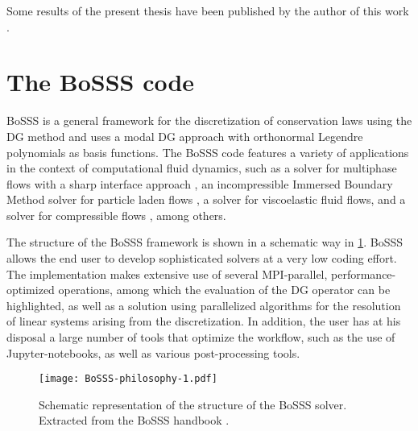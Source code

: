 Some results of the present thesis have been published by the author of this work \parencite{gutierrez-jorqueraFullyCoupledHigh2022}.


\section{The BoSSS code}
BoSSS is a general framework for the discretization of conservation laws using the DG method and uses a modal DG approach with orthonormal Legendre polynomials as basis functions. The BoSSS code features a variety of applications in the context of computational fluid dynamics, such as a solver for multiphase flows with a sharp interface approach \parencite{kummerExtendedDiscontinuousGalerkin2017}, an incompressible Immersed Boundary Method solver for particle laden flows \parencite{krauseIncompressibleImmersedBoundary2017}, a solver for viscoelastic fluid flows\parencite{kikkerFullyCoupledHighorder}, and a solver for compressible flows \parencite{geisenhoferDiscontinuousGalerkinImmersed2019}, among others.

The structure of the BoSSS framework is shown in a schematic way in \cref{Fig:BoSSS}. BoSSS allows the end user to develop sophisticated solvers at a very low coding effort. The implementation makes extensive use of several \gls{MPI}-parallel, performance-optimized operations, among which the evaluation of the DG operator can be highlighted, as well as a solution using parallelized algorithms for the resolution of linear systems arising from the discretization. In addition, the user has at his disposal a large number of tools that optimize the workflow, such as the use of Jupyter-notebooks, as well as various post-processing tools.
\begin{figure}
	\texttt{[image: BoSSS-philosophy-1.pdf]}
	\caption[Schematic representation of the structure of the BoSSS solver.]{Schematic representation of the structure of the BoSSS solver. Extracted from the BoSSS handbook \parencite{kummer2020}.}
	\label{Fig:BoSSS}
\end{figure}

